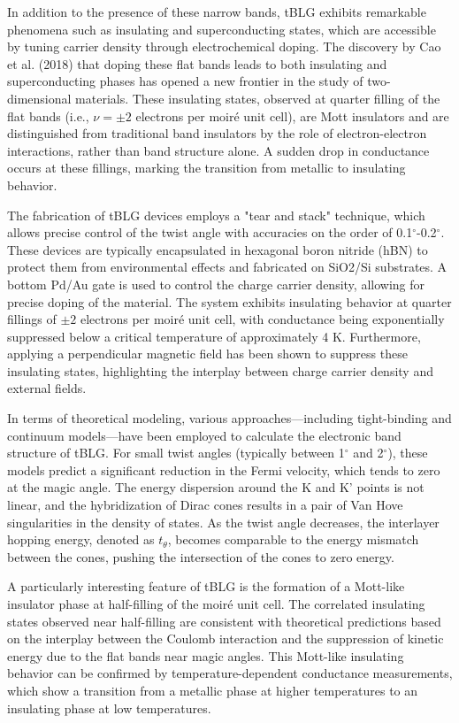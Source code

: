 In addition to the presence of these narrow bands, tBLG exhibits remarkable phenomena such as insulating and superconducting states, which are accessible by tuning carrier density through electrochemical doping. The discovery by Cao et al. (2018) that doping these flat bands leads to both insulating and superconducting phases has opened a new frontier in the study of two-dimensional materials. These insulating states, observed at quarter filling of the flat bands (i.e., \(\nu = \pm 2\) electrons per moiré unit cell), are Mott insulators and are distinguished from traditional band insulators by the role of electron-electron interactions, rather than band structure alone. A sudden drop in conductance occurs at these fillings, marking the transition from metallic to insulating behavior.

The fabrication of tBLG devices employs a "tear and stack" technique, which allows precise control of the twist angle with accuracies on the order of 0.1$^\circ$-0.2$^\circ$. These devices are typically encapsulated in hexagonal boron nitride (hBN) to protect them from environmental effects and fabricated on SiO2/Si substrates. A bottom Pd/Au gate is used to control the charge carrier density, allowing for precise doping of the material. The system exhibits insulating behavior at quarter fillings of \(\pm 2\) electrons per moiré unit cell, with conductance being exponentially suppressed below a critical temperature of approximately 4 K. Furthermore, applying a perpendicular magnetic field has been shown to suppress these insulating states, highlighting the interplay between charge carrier density and external fields.

In terms of theoretical modeling, various approaches—including tight-binding and continuum models—have been employed to calculate the electronic band structure of tBLG. For small twist angles (typically between 1$^\circ$ and 2$^\circ$), these models predict a significant reduction in the Fermi velocity, which tends to zero at the magic angle. The energy dispersion around the K and K' points is not linear, and the hybridization of Dirac cones results in a pair of Van Hove singularities in the density of states. As the twist angle decreases, the interlayer hopping energy, denoted as \(t_\theta\), becomes comparable to the energy mismatch between the cones, pushing the intersection of the cones to zero energy.

A particularly interesting feature of tBLG is the formation of a Mott-like insulator phase at half-filling of the moiré unit cell. The correlated insulating states observed near half-filling are consistent with theoretical predictions based on the interplay between the Coulomb interaction and the suppression of kinetic energy due to the flat bands near magic angles. This Mott-like insulating behavior can be confirmed by temperature-dependent conductance measurements, which show a transition from a metallic phase at higher temperatures to an insulating phase at low temperatures.

